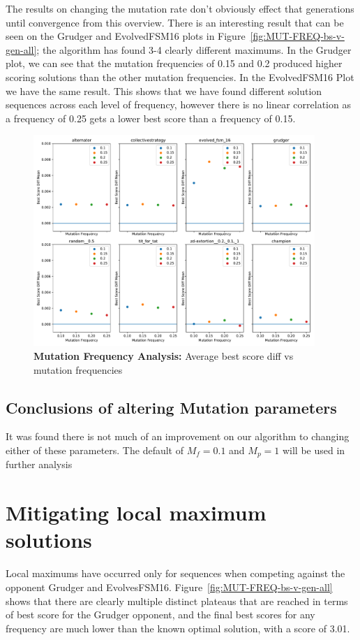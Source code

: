 The results on changing the mutation rate don't obviously effect that generations until convergence from this overview.
There is an interesting result that can be seen on the Grudger and EvolvedFSM16 plots in Figure~\ref{fig:MUT-FREQ-bs-v-gen-all};
the algorithm has found 3-4 clearly different maximums.
In the Grudger plot, we can see that the mutation frequencies of 0.15 and 0.2 produced higher scoring solutions than the other mutation frequencies.
In the EvolvedFSM16 Plot we have the same result.
This shows that we have found different solution sequences across each level of frequency, however there is no linear correlation as a frequency of 0.25 gets a lower best score than a frequency of 0.15.

\begin{figure}[ht]
    \includegraphics[width=0.95\textwidth, keepaspectratio, center]{./img/plots/MUT_FREQ_bs_diff_v_freq_all.pdf}
    \caption{\textbf{Mutation Frequency Analysis:} Average best score diff vs mutation frequencies}\label{fig:MUT-FREQ-bs-diff-v-freq-all}
\end{figure}

\subsection{Conclusions of altering Mutation parameters}
It was found there is not much of an improvement on our algorithm to changing either of these parameters.
The default of $M_f=0.1$ and $M_p=1$ will be used in further analysis 


\section{Mitigating local maximum solutions}\label{sec:mitigatingLocalMaximums}
Local maximums have occurred only for sequences when competing against the opponent Grudger and EvolvesFSM16.
Figure~\ref{fig:MUT-FREQ-bs-v-gen-all} shows that there are clearly multiple distinct plateaus that are reached in terms of best score for the Grudger opponent, and the final best scores for any frequency are much lower than the known optimal solution, with a score of 3.01.

